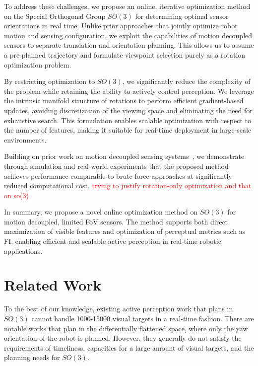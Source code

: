 \documentclass[letterpaper, 10 pt, conference]{ieeeconf}  %
\begin{document}

To address these challenges, we propose an online, iterative optimization method on the Special Orthogonal Group $SO(3)$ for determining optimal sensor orientations in real time. Unlike prior approaches that jointly optimize robot motion and sensing configuration, we exploit the capabilities of motion decoupled sensors to separate translation and orientation planning. This allows us to assume a pre-planned trajectory and formulate viewpoint selection purely as a rotation optimization problem.

By restricting optimization to $SO(3)$, we significantly reduce the complexity of the problem while retaining the ability to actively control perception. We leverage the intrinsic manifold structure of rotations to perform efficient gradient-based updates, avoiding discretization of the viewing space and eliminating the need for exhaustive search. This formulation enables scalable optimization with respect to the number of features, making it suitable for real-time deployment in large-scale environments.

Building on prior work on motion decoupled sensing systems~\cite{https://doi.org/10.48550/arxiv.2302.14334}, we demonstrate through simulation and real-world experiments that the proposed method achieves performance comparable to brute-force approaches at significantly reduced computational cost. \textcolor{red}{trying to justify rotation-only optimization and that on so(3)}


In summary, we propose a novel online optimization method on $SO(3)$ for motion decoupled, limited FoV sensors. The method supports both direct maximization of visible features and optimization of perceptual metrics such as FI, enabling efficient and scalable active perception in real-time robotic applications.

\color{black}

\section{Related Work}
To the best of our knowledge, existing active perception work that plans in $SO(3)$ cannot handle 1000-15000 visual targets in a real-time fashion. There are notable works that plan in the differentially flattened space, where only the yaw orientation of the robot is planned. However, they generally do not satisfy the requirements of timeliness, capacities for a large amount of visual targets, and the planning needs for $SO(3)$.
\end{document}

